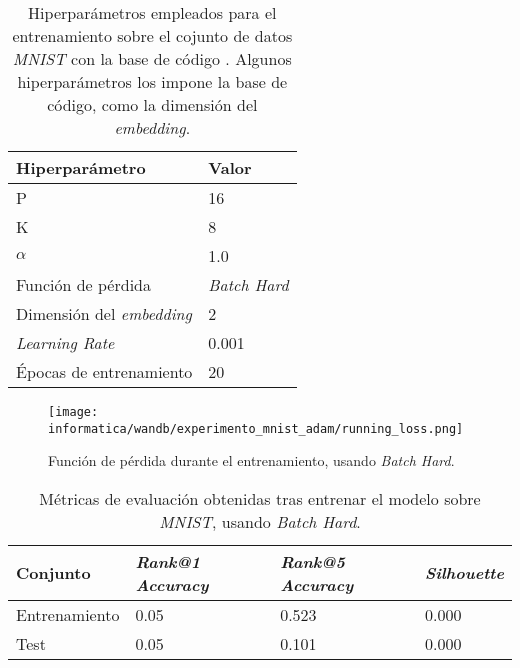 \begin{table}[!hbtp]
\centering
\begin{tabular}{|l|l|}
    \hline
    Hiperparámetro & Valor \\
    \hline

    P & 16 \\
    K & 8 \\
    $\alpha$ & 1.0 \\
    Función de pérdida & \textit{Batch Hard} \\
    Dimensión del \textit{embedding} & 2 \\
    \textit{Learning Rate} & 0.001 \\
    Épocas de entrenamiento & 20 \\
    \hline
\end{tabular}
    \caption{Hiperparámetros empleados para el entrenamiento sobre el cojunto de datos \textit{MNIST} con la base de código \cite{informatica:adambielski_github}. Algunos hiperparámetros los impone la base de código, como la dimensión del \textit{embedding}.}
    \label{table:hp_adam_mnist}
\end{table}

\begin{figure}[!hbtp]
    \centering
    \texttt{[image: informatica/wandb/experimento\_mnist\_adam/running\_loss.png]}
    \caption{Función de pérdida durante el entrenamiento, usando \textit{Batch Hard}.}
    \label{img:proceso_entrenamiento_adam_mnist}
\end{figure}

\begin{table}[!hbtp]
\centering
\begin{tabular}{|l|l|l|l|}
    \hline
    Conjunto & \textit{Rank@1 Accuracy} & \textit{Rank@5 Accuracy} & \textit{Silhouette} \\
    \hline

    Entrenamiento &  0.05 &  0.523 &  0.000 \\
    Test &  0.05 &  0.101 &  0.000 \\

    \hline

\end{tabular}
\caption{Métricas de evaluación obtenidas tras entrenar el modelo sobre \textit{MNIST}, usando \textit{Batch Hard}.}
    \label{table:resultados_adam_mnist}
\end{table}

